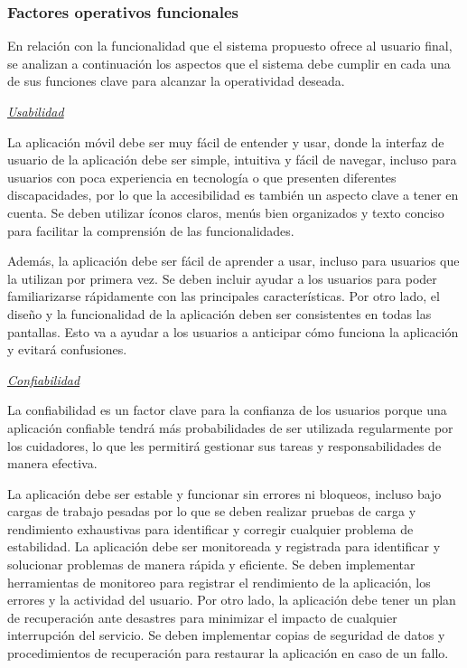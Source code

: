 \documentclass[a4paper,12pt]{article}
\begin{document}
    \subsubsection{Factores operativos funcionales}
    \par En relación con la funcionalidad que el sistema propuesto ofrece al usuario final, se analizan a continuación los aspectos que el sistema debe cumplir en cada una de sus funciones clave para alcanzar la operatividad deseada.
    \newline
    \par \textit{\underline{Usabilidad}}
    \newline
    \par La aplicación móvil debe ser muy fácil de entender y usar, donde la interfaz de usuario de la aplicación debe ser simple, intuitiva y fácil de navegar, incluso para usuarios con poca experiencia en tecnología o que presenten diferentes discapacidades, por lo que la  accesibilidad es también un aspecto clave a tener en cuenta. Se deben utilizar íconos claros, menús bien organizados y texto conciso para facilitar la comprensión de las funcionalidades. 
    \par Además, la aplicación debe ser fácil de aprender a usar, incluso para usuarios que la utilizan por primera vez. Se deben incluir ayudar a los usuarios para poder familiarizarse rápidamente con las principales características. Por otro lado, el diseño y la funcionalidad de la aplicación deben ser consistentes en todas las pantallas. Esto va a ayudar a los usuarios a anticipar cómo funciona la aplicación y evitará confusiones.
    \newline
    \par \textit{\underline{Confiabilidad}} 
    \newline
    \par La confiabilidad es un factor clave para la confianza de los usuarios porque una aplicación confiable tendrá más probabilidades de ser utilizada regularmente por los cuidadores, lo que les permitirá gestionar sus tareas y responsabilidades de manera efectiva.
    \par La aplicación debe ser estable y funcionar sin errores ni bloqueos, incluso bajo cargas de trabajo pesadas por lo que se deben realizar pruebas de carga y rendimiento exhaustivas para identificar y corregir cualquier problema de estabilidad. La aplicación debe ser monitoreada y registrada para identificar y solucionar problemas de manera rápida y eficiente. Se deben implementar herramientas de monitoreo para registrar el rendimiento de la aplicación, los errores y la actividad del usuario. Por otro lado, la aplicación debe tener un plan de recuperación ante desastres para minimizar el impacto de cualquier interrupción del servicio. Se deben implementar copias de seguridad de datos y procedimientos de recuperación para restaurar la aplicación en caso de un fallo.
\end{document}
